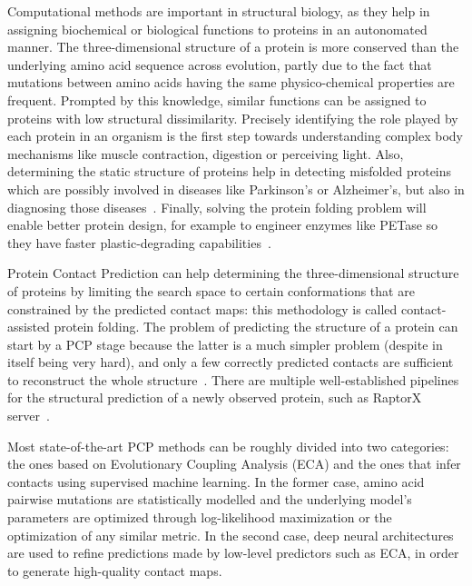     Computational methods are important in structural biology,
    as they help in assigning biochemical or biological functions to proteins
    in an autonomated manner.
    The three-dimensional structure of a protein is more conserved than the
    underlying amino acid sequence across evolution, partly due to the fact that
    mutations between amino acids having the same physico-chemical properties are frequent.
    Prompted by this knowledge, similar functions
    can be assigned to proteins with low structural dissimilarity.
    Precisely identifying the role played by each protein in an organism is the first step
    towards understanding complex body mechanisms like muscle contraction, digestion or perceiving light.
    Also, determining the static structure of proteins help in detecting misfolded proteins
    which are possibly involved in diseases like Parkinson's or
    Alzheimer's, but also in diagnosing those diseases~\cite{forloni2002protein}.
    Finally, solving the protein folding problem will enable
    better protein design, for example to engineer enzymes like PETase
    so they have faster plastic-degrading capabilities~\cite{DeepMind}.

    Protein Contact Prediction can help determining the three-dimensional structure of
    proteins by limiting the search space to certain conformations that are
    constrained by the predicted contact maps: this methodology is called contact-assisted protein folding.
    The problem of predicting the structure of a protein can start by a PCP stage because the latter is a much simpler problem
    (despite in itself being very hard), and only a few correctly predicted contacts
    are sufficient to reconstruct the whole structure~\cite{kim2014one}.
    There are multiple well-established pipelines for the structural prediction of a newly
    observed protein, such as RaptorX server~\cite{peng2011raptorx}.

    Most state-of-the-art PCP methods can be roughly divided into two categories:
    the ones based on Evolutionary Coupling Analysis (ECA) and the ones that infer contacts using
    supervised machine learning. In the former case, amino acid pairwise mutations
    are statistically modelled and the underlying model's parameters
    are optimized through log-likelihood maximization or the optimization of any similar metric.
    In the second case, deep neural architectures are used to
    refine predictions made by low-level predictors such as ECA, in order to generate high-quality contact maps.

